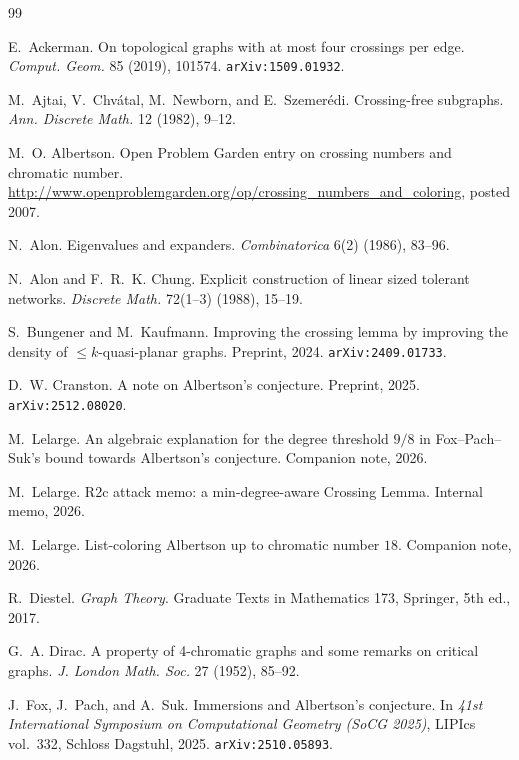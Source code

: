 \documentclass[11pt,a4paper]{article}
\theoremstyle{definition}
\begin{document}
\begin{thebibliography}{99}

E.~Ackerman.
\newblock On topological graphs with at most four crossings per edge.
\newblock \emph{Comput. Geom.} 85 (2019), 101574.
\newblock \texttt{arXiv:1509.01932}.

M.~Ajtai, V.~Chv\'atal, M.~Newborn, and E.~Szemer\'edi.
\newblock Crossing-free subgraphs.
\newblock \emph{Ann. Discrete Math.} 12 (1982), 9--12.

M.~O. Albertson.
\newblock Open Problem Garden entry on crossing numbers and chromatic number.
\newblock \url{http://www.openproblemgarden.org/op/crossing_numbers_and_coloring},
posted 2007.

N.~Alon.
\newblock Eigenvalues and expanders.
\newblock \emph{Combinatorica} 6(2) (1986), 83--96.

N.~Alon and F.~R.~K. Chung.
\newblock Explicit construction of linear sized tolerant networks.
\newblock \emph{Discrete Math.} 72(1--3) (1988), 15--19.

S.~Bungener and M.~Kaufmann.
\newblock Improving the crossing lemma by improving the density of
$\le k$-quasi-planar graphs.
\newblock Preprint, 2024.
\newblock \texttt{arXiv:2409.01733}.

D.~W. Cranston.
\newblock A note on Albertson's conjecture.
\newblock Preprint, 2025.
\newblock \texttt{arXiv:2512.08020}.

M.~Lelarge.
\newblock An algebraic explanation for the degree threshold $9/8$
in Fox--Pach--Suk's bound towards Albertson's conjecture.
\newblock Companion note, 2026.

M.~Lelarge.
\newblock R2c attack memo: a min-degree-aware Crossing Lemma.
\newblock Internal memo, 2026.

M.~Lelarge.
\newblock List-coloring Albertson up to chromatic number $18$.
\newblock Companion note, 2026.

R.~Diestel.
\newblock \emph{Graph Theory}.
\newblock Graduate Texts in Mathematics 173, Springer, 5th ed., 2017.

G.~A. Dirac.
\newblock A property of 4-chromatic graphs and some remarks on
critical graphs.
\newblock \emph{J. London Math. Soc.} 27 (1952), 85--92.

J.~Fox, J.~Pach, and A.~Suk.
\newblock Immersions and Albertson's conjecture.
\newblock In \emph{41st International Symposium on Computational
Geometry (SoCG 2025)}, LIPIcs vol.~332, Schloss Dagstuhl, 2025.
\newblock \texttt{arXiv:2510.05893}.


\end{thebibliography}
\end{document}
